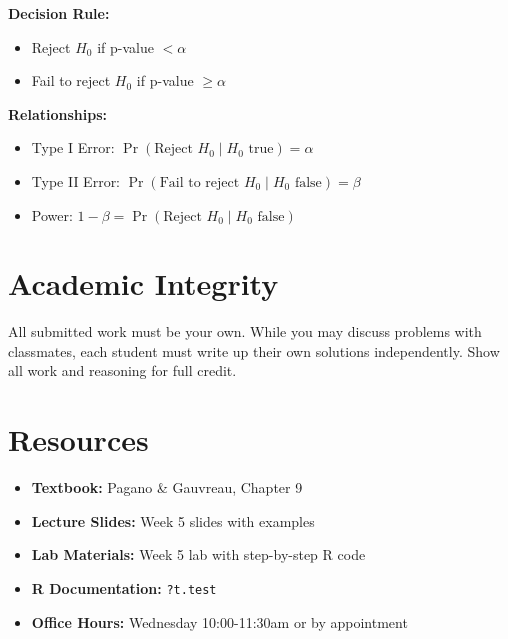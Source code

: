 \documentclass[11pt]{article}
\begin{document}
\textbf{Decision Rule:}
\begin{itemize}
\item Reject $H_0$ if p-value $< \alpha$
\item Fail to reject $H_0$ if p-value $\geq \alpha$
\end{itemize}

\textbf{Relationships:}
\begin{itemize}
\item Type I Error: $\Pr(\text{Reject } H_0 \mid H_0 \text{ true}) = \alpha$
\item Type II Error: $\Pr(\text{Fail to reject } H_0 \mid H_0 \text{ false}) = \beta$
\item Power: $1 - \beta = \Pr(\text{Reject } H_0 \mid H_0 \text{ false})$
\end{itemize}

\section*{Academic Integrity}

All submitted work must be your own. While you may discuss problems with classmates, each student must write up their own solutions independently. Show all work and reasoning for full credit.

\section*{Resources}

\begin{itemize}
\item \textbf{Textbook:} Pagano \& Gauvreau, Chapter 9
\item \textbf{Lecture Slides:} Week 5 slides with examples
\item \textbf{Lab Materials:} Week 5 lab with step-by-step R code
\item \textbf{R Documentation:} \texttt{?t.test}
\item \textbf{Office Hours:} Wednesday 10:00-11:30am or by appointment
\end{itemize}
\end{document}
